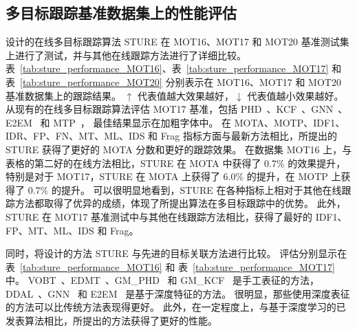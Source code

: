 \subsection{多目标跟踪基准数据集上的性能评估}
设计的在线多目标跟踪算法 STURE 在 MOT16、MOT17 和 MOT20 基准测试集上进行了测试，并与其他在线跟踪方法进行了详细比较。
表~\ref{tab:sture_performance_MOT16}、表~\ref{tab:sture_performance_MOT17} 和表~\ref{tab:sture_performance_MOT20} 分别表示在 MOT16、MOT17 和 MOT20 基准数据集上的跟踪结果。
$\uparrow$ 代表值越大效果越好，$\downarrow$ 代表值越小效果越好。
从现有的在线多目标跟踪算法评估 MOT17 基准，包括 PHD~\cite{ban2016tracking}、KCF~\cite{chen2017enhancing}、GNN~\cite{li2020graph}、E2EM~\cite{kieritz2016online} 和 MTP~\cite{kim2021discriminative}，
最佳结果显示在加粗字体中。
在 MOTA、MOTP、IDF1、IDR、FP、FN、MT、ML、IDS 和 Frag 指标方面与最新方法相比，所提出的 STURE 获得了更好的 MOTA 分数和更好的跟踪效果。
在数据集 MOT16 上，与表格的第二好的在线方法相比，STURE 在 MOTA 中获得了 0.7$\%$ 的效果提升，
特别是对于 MOT17，STURE 在 MOTA 上获得了 6.0$\%$ 的提升，在 MOTP 上获得了 0.7$\%$ 的提升。
可以很明显地看到，STURE 在各种指标上相对于其他在线跟踪方法都取得了优异的成绩，体现了所提出算法在多目标跟踪中的优势。
此外，STURE 在 MOT17 基准测试中与其他在线跟踪方法相比，获得了最好的 IDF1、FP、MT、ML、IDS 和 Frag。

同时，将设计的方法 STURE 与先进的目标关联方法进行比较。
评估分别显示在表~\ref{tab:sture_performance_MOT16} 和 表~\ref{tab:sture_performance_MOT17} 中。
VOBT~\cite{ban2016tracking}、EDMT~\cite{chen2017enhancing}、GM\_PHD~\cite{ban2016tracking} 和 GM\_KCF~\cite{chen2017enhancing} 是手工表征的方法，
DDAL~\cite{RN601}、GNN~\cite{li2020graph} 和 E2EM~\cite{kieritz2016online} 是基于深度特征的方法。
很明显，那些使用深度表征的方法可以比传统方法表现得更好。
此外，在一定程度上，与基于深度学习的已发表算法相比，所提出的方法获得了更好的性能。


